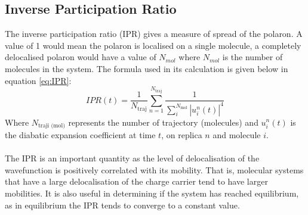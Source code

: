 \subsection{Inverse Participation Ratio}
The inverse participation ratio (IPR) gives a measure of spread of the polaron. A value of 1 would mean the polaron is localised on a single molecule, a completely delocalised polaron would have a value of $N_{mol}$ where $N_{mol}$ is the number of molecules in the system. The formula used in its calculation is given below in equation \eqref{eq:IPR}:
\begin{equation}
  IPR(t) = \frac{1}{N_{\text{traj}}} \sum_{n=1}^{N_{\text{traj}}} \frac{1}{\sum_{i}^{N_{\text{mol}}} \left| u_{i}^{n}(t) \right|^4}
  \label{eq:IPR}
\end{equation}
Where $N_{\text{traji (mol)}}$ represents the number of trajectory (molecules) and $u_{i}^{n}(t)$ is the diabatic expansion coefficient at time $t$, on replica $n$ and molecule $i$. 
\\\\
The IPR is an important quantity as the level of delocalisation of the wavefunction is positively correlated with its mobility. That is, molecular systems that have a large delocalisation of the charge carrier tend to have larger mobilities. It is also useful in determining if the system has reached equilibrium, as in equilibrium the IPR tends to converge to a constant value.


